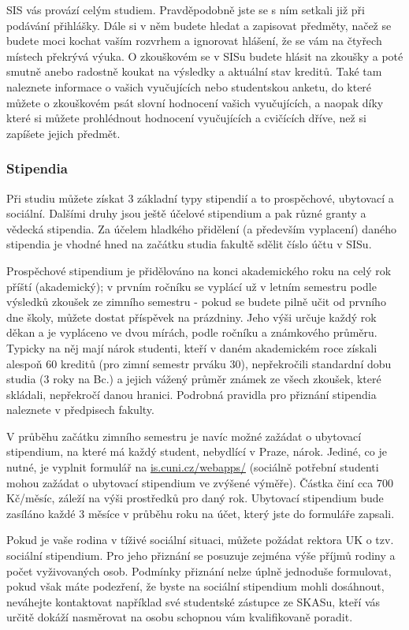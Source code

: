 SIS vás provází celým studiem. Pravděpodobně jste se s ním setkali již při
podávání přihlášky. Dále si v něm budete hledat a zapisovat předměty, načež se
budete moci kochat vaším rozvrhem a ignorovat hlášení, že se vám na čtyřech
místech překrývá výuka. O zkouškovém se v SISu budete hlásit na zkoušky a poté
smutně anebo radostně koukat na výsledky a aktuální stav kreditů. Také tam
naleznete informace o vašich vyučujících nebo studentskou anketu, do které
můžete o zkouškovém psát slovní hodnocení vašich vyučujících, a naopak díky
které si můžete prohlédnout hodnocení vyučujících a cvičících dříve, než si
zapíšete jejich předmět.


\subsubsection{Stipendia}
Při studiu můžete získat 3 základní typy stipendií a to prospěchové, ubytovací a
sociální. Dalšími druhy jsou ještě účelové stipendium a pak různé granty a
vědecká stipendia. Za účelem hladkého přidělení (a především vyplacení) daného
stipendia je vhodné hned na začátku studia fakultě sdělit číslo účtu v SISu.

Prospěchové stipendium je přidělováno na konci akademického roku na celý rok
příští (akademický); v prvním ročníku se vyplácí už v letním semestru podle
výsledků zkoušek ze zimního semestru - pokud se budete pilně učit od prvního dne
školy, můžete dostat příspěvek na prázdniny. Jeho výši určuje každý rok děkan a
je vypláceno ve dvou mírách, podle ročníku a známkového průměru. Typicky na něj
mají nárok studenti, kteří v daném akademickém roce získali alespoň 60 kreditů
(pro zimní semestr prváku 30), nepřekročili standardní dobu studia (3 roky na
Bc.) a jejich vážený průměr známek ze všech zkoušek, které skládali, nepřekročí
danou hranici. Podrobná pravidla pro přiznání stipendia naleznete v předpisech
fakulty.

V průběhu začátku zimního semestru je navíc možné zažádat o ubytovací
stipendium, na které má každý student, nebydlící v Praze, nárok. Jediné, co je nutné, je vyplnit
formulář na \url{is.cuni.cz/webapps/} (sociálně potřební studenti mohou
zažádat o ubytovací stipendium ve zvýšené výměře). Částka činí cca 700 Kč/měsíc, záleží na výši
prostředků pro daný rok. Ubytovací stipendium bude zasíláno každé 3 měsíce v
průběhu roku na účet, který jste do formuláře zapsali.

Pokud je vaše rodina v tíživé sociální situaci, můžete požádat rektora UK o tzv.
sociální stipendium. Pro jeho přiznání se posuzuje zejména výše příjmů rodiny a
počet vyživovaných osob. Podmínky přiznání nelze úplně jednoduše formulovat,
pokud však máte podezření, že byste na sociální stipendium mohli dosáhnout,
neváhejte kontaktovat například své studentské zástupce ze SKASu, kteří vás
určitě dokáží nasměrovat na osobu schopnou vám kvalifikovaně poradit.

